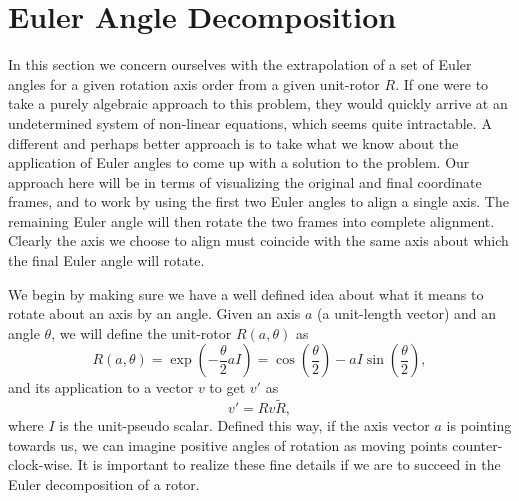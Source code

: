 \documentclass[12pt]{article}
\begin{document}
\section*{Euler Angle Decomposition}

In this section we concern ourselves with the extrapolation of a set of Euler angles for
a given rotation axis order from a given unit-rotor $R$.  If one were to take a purely algebraic
approach to this problem, they would quickly arrive at an undetermined system of non-linear equations,
which seems quite intractable.  A different and perhaps better approach is to take what we know
about the application of Euler angles to come up with a solution to the problem.
Our approach here will be in terms of visualizing the original and final coordinate frames,
and to work by using the first two Euler angles to align a single axis.  The remaining Euler angle
will then rotate the two frames into complete alignment.  Clearly the axis we choose to align must
coincide with the same axis about which the final Euler angle will rotate.

We begin by making sure we have a well defined idea about what it means to rotate
about an axis by an angle.  Given an axis $a$ (a unit-length vector) and an angle $\theta$,
we will define the unit-rotor $R(a,\theta)$ as
\begin{equation*}
R(a,\theta) = \exp\left(-\frac{\theta}{2}aI\right) = \cos\left(\frac{\theta}{2}\right)-aI\sin\left(\frac{\theta}{2}\right),
\end{equation*}
and its application to a vector $v$ to get $v'$ as
\begin{equation*}
v' = Rv\tilde{R},
\end{equation*}
where $I$ is the unit-pseudo scalar.  Defined this way, if the axis vector $a$ is pointing towards us,
we can imagine positive angles of rotation as moving points counter-clock-wise.  It is important to
realize these fine details if we are to succeed in the Euler decomposition of a rotor.
\end{document}
